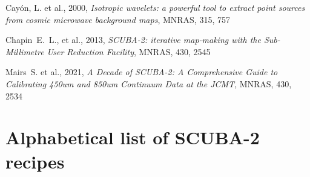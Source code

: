 \documentclass[twoside,11pt,nolof]{starlink}
\begin{document}
\scfrontmatter

\newpage

\newpage

\newpage

\newpage

\newpage

\newpage







\begin{thebibliography}{}
 Cay{\'o}n, L. et al., 2000, \textit{Isotropic
    wavelets: a powerful tool to extract point sources from cosmic
    microwave background maps}, MNRAS, 315, 757

Chapin~E.~L., et al., 2013, \textit{SCUBA-2: iterative map-making with
  the Sub-Millimetre User Reduction Facility}, MNRAS, 430, 2545

Mairs~S. et al., 2021, \textit{A Decade of SCUBA-2: A Comprehensive Guide
  to Calibrating 450um and 850um Continuum Data at the JCMT}, MNRAS, 430, 2534
\end{thebibliography}

\newpage
\appendix



\newpage

\newpage

\newpage

\newpage

\section{Alphabetical list of SCUBA-2 recipes\label{ap:list}}
\end{document}
